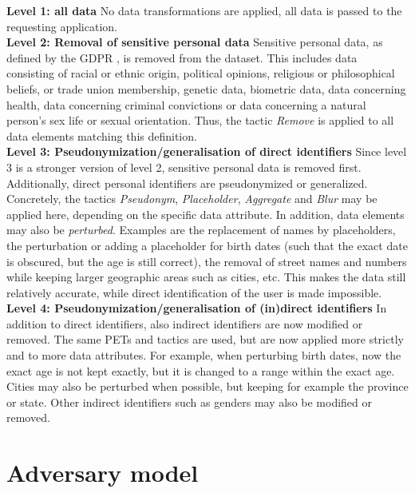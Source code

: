 \noindent \textbf{Level 1: all data} No data transformations are applied, all data is passed to the requesting application.\\

\noindent \textbf{Level 2: Removal of sensitive personal data} Sensitive personal data, as defined by the GDPR \citep{gdpr}, is removed from the dataset. This includes data consisting of racial or ethnic origin, political opinions, religious or philosophical beliefs, or trade union membership, genetic data, biometric data, data concerning health, data concerning criminal convictions or data concerning a natural person's sex life or sexual orientation. Thus, the tactic \textit{Remove} is applied to all data elements matching this definition.\\

\noindent \textbf{Level 3: Pseudonymization/generalisation of direct identifiers} Since level 3 is a stronger version of level 2, sensitive personal data is removed first. Additionally, direct personal identifiers are pseudonymized or generalized. Concretely, the tactics \textit{Pseudonym}, \textit{Placeholder}, \textit{Aggregate} and \textit{Blur} may be applied here, depending on the specific data attribute. In addition, data elements may also be \textit{perturbed}. Examples are the replacement of names by placeholders, the perturbation or adding a placeholder for birth dates (such that the exact date is obscured, but the age is still correct), the removal of street names and numbers while keeping larger geographic areas such as cities, etc. This makes the data still relatively accurate, while direct identification of the user is made impossible.\\

\noindent \textbf{Level 4: Pseudonymization/generalisation of (in)direct identifiers} In addition to direct identifiers, also indirect identifiers are now modified or removed. The same \gls{PETs} and tactics are used, but are now applied more strictly and to more data attributes. For example, when perturbing birth dates, now the exact age is not kept exactly, but it is changed to a range within the exact age. Cities may also be perturbed when possible, but keeping for example the province or state. Other indirect identifiers such as genders may also be modified or removed.

\section{Adversary model}

